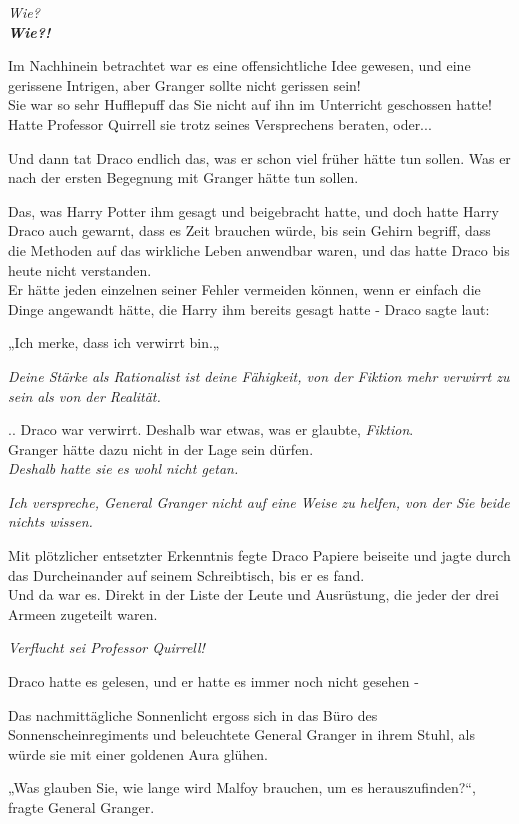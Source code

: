 {\emph{Wie?}\\ \textbf{\emph{Wie?!}}

Im Nachhinein betrachtet war es eine offensichtliche Idee gewesen, und eine gerissene Intrigen, aber Granger sollte nicht gerissen sein!\\ Sie war so sehr Hufflepuff das Sie nicht auf ihn im Unterricht geschossen hatte! Hatte Professor Quirrell sie trotz seines Versprechens beraten, oder...

Und dann tat Draco endlich das, was er schon viel früher hätte tun sollen. Was er nach der ersten Begegnung mit Granger hätte tun sollen.

Das, was Harry Potter ihm gesagt und beigebracht hatte, und doch hatte Harry Draco auch gewarnt, dass es Zeit brauchen würde, bis sein Gehirn begriff, dass die Methoden auf das wirkliche Leben anwendbar waren, und das hatte Draco bis heute nicht verstanden.\\ Er hätte jeden einzelnen seiner Fehler vermeiden können, wenn er einfach die Dinge angewandt hätte, die Harry ihm bereits gesagt hatte - Draco sagte laut:

„Ich merke, dass ich verwirrt bin.„

\emph{Deine Stärke als Rationalist ist deine Fähigkeit, von der Fiktion mehr verwirrt zu sein als von der Realität.}

.. Draco war verwirrt. Deshalb war etwas, was er glaubte, \emph{Fiktion}.\\ Granger hätte dazu nicht in der Lage sein dürfen.\\ \emph{Deshalb hatte sie es wohl nicht getan.}

\emph{Ich verspreche, General Granger nicht auf eine Weise zu helfen, von der Sie beide nichts wissen.}

Mit plötzlicher entsetzter Erkenntnis fegte Draco Papiere beiseite und jagte durch das Durcheinander auf seinem Schreibtisch, bis er es fand.\\ Und da war es. Direkt in der Liste der Leute und Ausrüstung, die jeder der drei Armeen zugeteilt waren.

\emph{Verflucht sei Professor Quirrell!}

Draco hatte es gelesen, und er hatte es immer noch nicht gesehen -

Das nachmittägliche Sonnenlicht ergoss sich in das Büro des Sonnenscheinregiments und beleuchtete General Granger in ihrem Stuhl, als würde sie mit einer goldenen Aura glühen.

„Was glauben Sie, wie lange wird Malfoy brauchen, um es herauszufinden?“, fragte General Granger.

}
